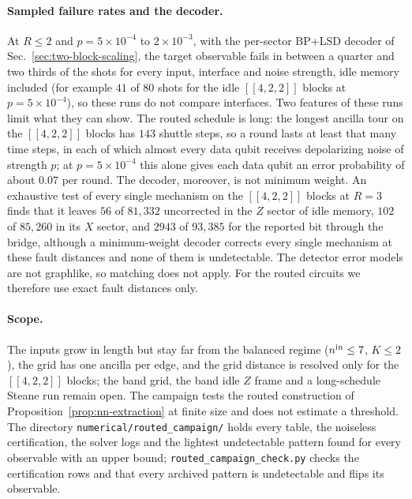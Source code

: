 \documentclass[aps,prx,reprint,superscriptaddress,nofootinbib,floatfix,longbibliography]{revtex4-2}
\theoremstyle{definition}
\begin{document}
\paragraph{Sampled failure rates and the decoder.}
At $R\le2$ and $p=5\times10^{-4}$ to $2\times10^{-3}$, with the per-sector
BP+LSD decoder of Sec.~\ref{sec:two-block-scaling}, the target observable
fails in between a quarter and two thirds of the shots for every input,
interface and noise strength, idle memory included (for example $41$ of $80$ shots for the idle $[[4,2,2]]$
blocks at $p=5\times10^{-4}$), so these runs do not compare interfaces.  Two
features of these runs limit what they can show.  The routed schedule is
long: the longest ancilla tour on
the $[[4,2,2]]$ blocks has $143$ shuttle steps, so a round lasts at least
that many time steps, in each of which almost every data qubit receives
depolarizing noise of strength $p$; at $p=5\times10^{-4}$ this alone gives
each data qubit an error probability of about $0.07$ per round.  The decoder,
moreover, is not minimum weight.  An exhaustive test of every single
mechanism on the $[[4,2,2]]$ blocks at $R=3$ finds that it leaves $56$ of $81{,}332$ uncorrected in the
$Z$ sector of idle memory, $102$ of $85{,}260$ in its $X$ sector, and $2943$
of $93{,}385$ for the reported bit through the bridge, although a
minimum-weight decoder corrects every single mechanism at these fault
distances and none of them is undetectable.  The detector error models are
not graphlike, so matching does not apply.  For the routed circuits we
therefore use exact fault distances only.

\paragraph{Scope.}
The inputs grow in length but stay far from the balanced regime
($n^{\rm in}\le7$, $K\le2$), the grid has one ancilla per edge, and the grid
distance is resolved only for the $[[4,2,2]]$ blocks; the band grid, the
band idle $Z$ frame and a long-schedule Steane run remain open.  The campaign
tests the routed construction of Proposition~\ref{prop:nn-extraction} at
finite size and does not estimate a threshold.  The directory
\nolinkurl{numerical/routed_campaign/} holds every table, the noiseless
certification, the solver logs and the lightest undetectable pattern found
for every observable with an upper bound; \texttt{routed\_campaign\_check.py}
checks the
certification rows and that every archived pattern is undetectable and flips
its observable.
\end{document}
